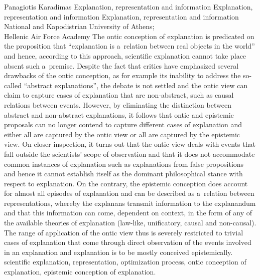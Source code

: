 \begin{artengenv}{Panagiotis Karadimas}
	{Explanation, representation and information}
	{Explanation, representation and information}
	{Explanation, representation and information}
	{National and Kapodistrian University of Athens;\\
	Hellenic Air Force Academy}
	{The ontic conception of explanation is predicated on the proposition that ``explanation is a~relation between real objects in the world'' and hence, according to this approach, scientific explanation cannot take place absent such a~premise. Despite the fact that critics have emphasized several drawbacks of the ontic conception, as for example its inability to address the so-called ``abstract explanations'', the debate is not settled and the ontic view can claim to capture cases of explanation that are non-abstract, such as causal relations between events. However, by eliminating the distinction between abstract and non-abstract explanations, it follows that ontic and epistemic proposals can no longer contend to capture different cases of explanation and either all are captured by the ontic view or all are captured by the epistemic view. On closer inspection, it turns out that the ontic view deals with events that fall outside the scientists' scope of observation and that it does not accommodate common instances of explanation such as explanations from false propositions and hence it cannot establish itself as the dominant philosophical stance with respect to explanation. On the contrary, the epistemic conception does account for almost all episodes of explanation and can be described as a~relation between representations, whereby the explanans transmit information to the explanandum and that this information can come, dependent on context, in the form of any of the available theories of explanation (law-like, unificatory, causal and non-causal). The range of application of the ontic view thus is severely restricted to trivial cases of explanation that come through direct observation of the events involved in an explanation and explanation is to be mostly conceived epistemically.
	}
	{scientific explanation, representation, optimization process, ontic conception of explanation, epistemic conception of explanation.}




\end{artengenv}
